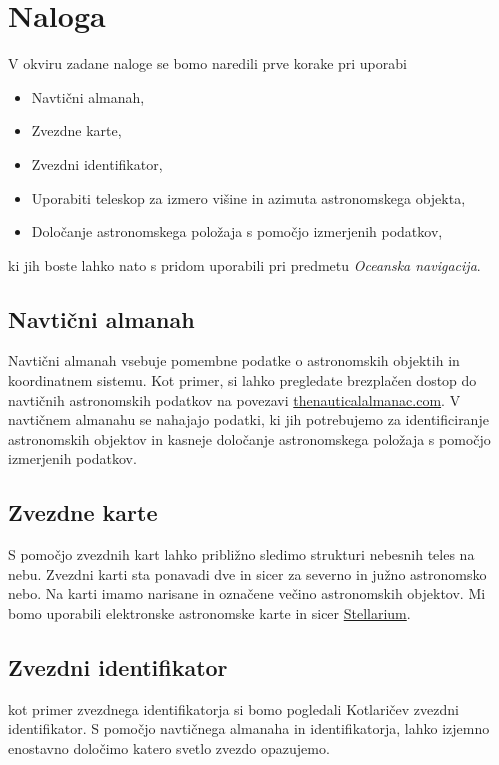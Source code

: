 \pagebreak

\section{Naloga}

V okviru zadane naloge se bomo naredili prve korake pri uporabi

\begin{itemize}
	\item Navtični almanah,
	\item Zvezdne karte,
	\item Zvezdni identifikator,
	\item Uporabiti teleskop za izmero višine in azimuta astronomskega objekta,
	\item Določanje astronomskega položaja s pomočjo izmerjenih podatkov,
\end{itemize}

ki jih boste lahko nato s pridom uporabili pri predmetu \textit{Oceanska navigacija}.

\subsection{Navtični almanah}
Navtični almanah vsebuje pomembne podatke o astronomskih objektih in koordinatnem sistemu. Kot primer, si lahko pregledate brezplačen dostop do navtičnih astronomskih podatkov na povezavi \href{https://thenauticalalmanac.com/}{thenauticalalmanac.com}. V navtičnem almanahu se nahajajo podatki, ki jih potrebujemo za identificiranje astronomskih objektov in kasneje določanje astronomskega položaja s pomočjo izmerjenih podatkov.

\subsection{Zvezdne karte}
S pomočjo zvezdnih kart lahko približno sledimo strukturi nebesnih teles na nebu. Zvezdni karti sta ponavadi dve in sicer za severno in južno astronomsko nebo. Na karti imamo narisane in označene večino astronomskih objektov. Mi bomo uporabili elektronske astronomske karte in sicer \href{http://www.stellarium.org/}{Stellarium}.

\subsection{Zvezdni identifikator} 
kot primer zvezdnega identifikatorja si bomo pogledali Kotlaričev zvezdni identifikator. S pomočjo navtičnega almanaha in identifikatorja, lahko izjemno enostavno določimo katero svetlo zvezdo opazujemo.

